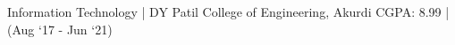 

\begin{cventries}

  \cventry
    {} %
    {Information Technology | DY Patil College of Engineering, Akurdi} %
    {CGPA: 8.99 | (Aug `17 - Jun `21)} %
    {} %
    {
      \begin{cvitems} %
      \end{cvitems}
    }

\end{cventries}

